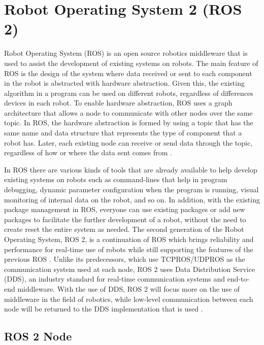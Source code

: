 \section{Robot Operating System 2 (ROS 2)}
\label{sec:ros2}

Robot Operating System (ROS) is an open source robotics middleware that is used to assist the development of existing systems on robots. The main feature of ROS is the design of the system where data received or sent to each component in the robot is abstracted with hardware abstraction.
Given this, the existing algorithm in a program can be used on different robots, regardless of differences devices in each robot. 
To enable hardware abstraction, ROS uses a graph architecture that allows a node to communicate with other nodes over the same topic. In ROS, the hardware abstraction is formed by using a topic that has the same name and data structure that represents the type of component that a robot has.
Later, each existing node can receive or send data through the topic, regardless of how or where the data sent comes from \parencite{fikri2021}.

In ROS there are various kinds of tools that are already available to help develop existing systems on robots such as command-lines that help in program debugging, dynamic parameter configuration when the program is running, visual monitoring of internal data on the robot, and so on. In addition, with the existing package management in ROS, everyone can use existing packages or add new packages to facilitate the further development of a robot, without the need to create
reset the entire system as needed. The second generation of the Robot Operating System, ROS 2, is a continuation of ROS which brings reliability and performance for real-time use of robots while still supporting the features of the previous ROS \parencite{Maruyama}. Unlike its predecessors, which use TCPROS/UDPROS as the communication system used at each node, ROS 2 uses Data Distribution Service (DDS), an industry standard for real-time communication systems and end-to-end middleware. 
With the use of DDS, ROS 2 will focus more on the use of middleware in the field of robotics, while low-level communication between each node will be returned to the DDS implementation that is used \parencite{fikri2021}.

\subsection{ROS 2 Node}
\label{subsec:ros2node}

